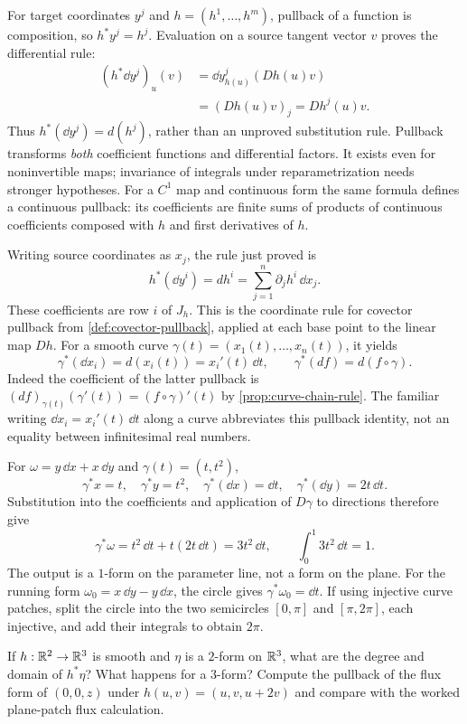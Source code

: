 For target coordinates $y^j$ and $h=(h^1,\ldots,h^m)$,
pullback of a function is composition, so $h^*y^j=h^j$.
Evaluation on a source tangent vector $v$ proves the differential rule:
\[
\begin{aligned}
(h^*\dd y^j)_u(v)
&=\dd y^j_{h(u)}(Dh(u)v)\\
&=(Dh(u)v)_j=Dh^j(u)v.
\end{aligned}
\]
Thus $h^*(\dd y^j)=d(h^j)$, rather than an unproved substitution
rule. Pullback transforms \emph{both} coefficient functions and
differential factors. It exists even for noninvertible maps; invariance
of integrals under reparametrization needs stronger hypotheses.
For a $C^1$ map and continuous form the same formula defines a continuous
pullback: its coefficients are finite sums of products of continuous
coefficients composed with $h$ and first derivatives of $h$.

Writing source coordinates as $x_j$, the rule just proved is
\[
h^*(\dd y^i)=dh^i=\sum_{j=1}^n\partial_jh^i\,\dd x_j.
\]
These coefficients are row $i$ of $J_h$. This is the coordinate rule
for covector pullback from \cref{def:covector-pullback}, applied at each
base point to the linear map $Dh$.
For a smooth curve $\gamma(t)=(x_1(t),\ldots,x_n(t))$, it yields
\[
\gamma^*(\dd x_i)=d(x_i(t))=x_i'(t)\,\dd t,\qquad
\gamma^*(df)=d(f\circ\gamma).
\]
Indeed the coefficient of the latter pullback is
$(df)_{\gamma(t)}(\gamma'(t))=(f\circ\gamma)'(t)$ by
\cref{prop:curve-chain-rule}. The familiar writing
$\dd x_i=x_i'(t)\,\dd t$ along a curve abbreviates this pullback
identity, not an equality between infinitesimal real numbers.

\begin{example}
For $\omega=y\,\dd x+x\,\dd y$ and $\gamma(t)=(t,t^2)$,
\[
\gamma^*x=t,\quad\gamma^*y=t^2,\quad
\gamma^*(\dd x)=\dd t,\quad\gamma^*(\dd y)=2t\,\dd t.
\]
Substitution into the coefficients and application of $D\gamma$ to
directions therefore give
\[
\gamma^*\omega=t^2\,\dd t+t(2t\,\dd t)=3t^2\,\dd t,
\qquad \int_0^1 3t^2\,\dd t=1.
\]
The output is a $1$-form on the parameter line, not a form on the plane.
For the running form $\omega_0=x\,\dd y-y\,\dd x$, the circle gives
$\gamma^*\omega_0=\dd t$. If using injective curve patches, split the
circle into the two semicircles $[0,\pi]$ and $[\pi,2\pi]$, each injective,
and add their integrals to obtain $2\pi$.
\end{example}
\begin{exercise}
If $h:\mathbb{R}^2\to\mathbb{R}^3$ is smooth and $\eta$ is a $2$-form on $\mathbb{R}^3$,
what are the degree and domain of $h^*\eta$? What happens for a $3$-form?
Compute the pullback of the flux form of $(0,0,z)$ under
$h(u,v)=(u,v,u+2v)$ and compare with the worked plane-patch flux calculation.
\end{exercise}

